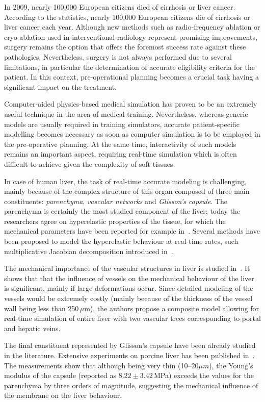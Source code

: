 \documentclass{llncs}
\begin{document}
In 2009, nearly 100,000 European citizens died of cirrhosis or liver cancer. 
According to the statistics, nearly 100,000 European citizens die of cirrhosis or liver cancer each year. 
Although new methods such as radio-frequency ablation or cryo-ablation used in interventional radiology 
represent promising improvements, surgery remains the option that offers the foremost success rate against these pathologies. 
Nevertheless, surgery is not always performed due to several limitations, in particular the determination 
of accurate eligibility criteria for the patient. 
In this context, pre-operational planning becomes a crucial task having a significant impact on the treatment. 

Computer-aided physics-based medical simulation has proven to be an extremely useful technique in the area of medical training. 
Nevertheless, whereas generic models are usually required in training simulators, accurate patient-specific modelling
becomes necessary as soon as computer simulation is to be employed in the pre-operative planning. At the same time, 
interactivity of such models  remains an important aspect, requiring real-time simulation which is often difficult to 
achieve given the complexity of soft tissues. 

In case of human liver, the task of real-time accurate modeling is challenging, mainly because of the complex structure 
of this organ composed of three main constituents: \emph{parenchyma}, \emph{vascular networks} and \emph{Glisson's capsule}.
The parenchyma is certainly the most studied component of the liver; today the researchers agree on hyperelastic 
properties of the tissue, for which the mechanical parameters have been reported for example in~\cite{}. 
Several methods have been proposed to model the hyperelastic behaviour at real-time rates, such multiplicative Jacobian decomposition
introduced in~\cite{stephanie2008}.

The mechanical importance of the vascular structures in liver is studied in~\cite{Peterlik2012}. It shows that that the 
influence of vessels on the mechanical behaviour of the liver is significant, mainly if large deformations occur. 
Since detailed modeling of the vessels would be extremely costly (mainly because of the thickness of the vessel wall 
being less than 250\,{$\mu$}m), the authors propose a composite model allowing for real-time simulation of entire liver
with two vascular trees corresponding to portal and hepatic veins.

The final constituent represented by Glisson's capsule have been already studied in the literature. 
Extensive experiments on porcine liver has been published in~\cite{Umale2013}. The measurements show that although being very 
thin (10--20$\mu m$), the Young's modulus of the capsule (reported as $8.22\pm3.42$\,MPa) exceeds the values for the parenchyma by three orders of magnitude,
suggesting the mechanical influence of the membrane on the liver behaviour.
\end{document}
